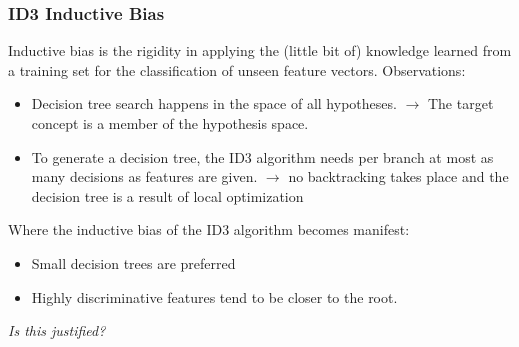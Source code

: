 \documentclass[11pt,a4paper]{article}
\begin{document}
\begin{flushleft}
\subsubsection{ID3 Inductive Bias}
Inductive bias is the rigidity in applying the (little bit of) knowledge learned from a
training set for the classification of unseen feature vectors.
Observations:
\begin{itemize}
\item Decision tree search happens in the space of all hypotheses. $\rightarrow$ The target concept is a member of the hypothesis space.
\item To generate a decision tree, the ID3 algorithm needs per branch at most as
many decisions as features are given. $\rightarrow$ no backtracking takes place and the decision tree is a result of local optimization
\end{itemize}
 
Where the inductive bias of the ID3 algorithm becomes manifest:
\begin{itemize}
\item Small decision trees are preferred
\item Highly discriminative features tend to be closer to the root.
\end{itemize}
\begin{center}
\textit{Is this justified?}
\end{center}

\end{flushleft}
\end{document}
